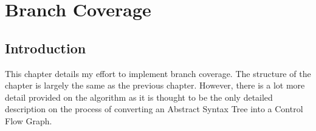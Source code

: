 \chapter{Branch Coverage}
\label{chap:branch}

\section{Introduction}
This chapter details my effort to implement branch coverage. The structure of the chapter is largely the same as the previous chapter. However, there is a lot more detail provided on the algorithm as it is thought to be the only detailed description on the process of converting an Abstract Syntax Tree into a Control Flow Graph.






